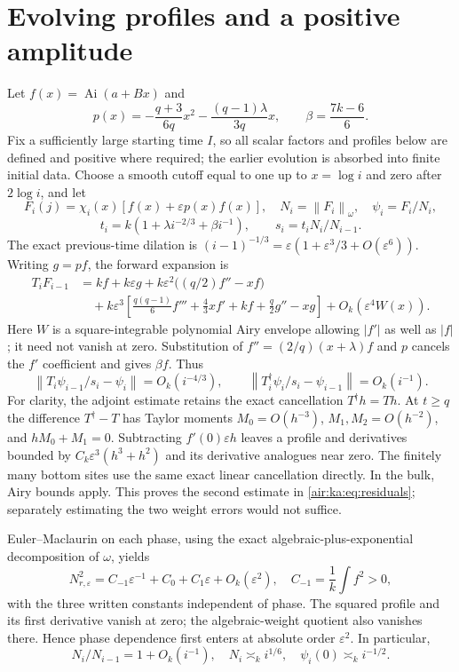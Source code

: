 \documentclass[11pt,letterpaper]{article}
\numberwithin{equation}{section}
\theoremstyle{remark}
\newcommand{\Ai}{\operatorname{Ai}}
\newcommand{\norm}[1]{\left\lVert#1\right\rVert}
\newcommand{\eps}{\varepsilon}
\begin{document}
\section{Evolving profiles and a positive amplitude}
Let $f(x)=\Ai(a+Bx)$ and
\[
 p(x)=-\frac{q+3}{6q}x^2-\frac{(q-1)\lambda}{3q}x,
 \qquad \beta=\frac{7k-6}{6}.
\]
Fix a sufficiently large starting time $I$, so all scalar factors and profiles below are defined and positive where required; the earlier evolution is absorbed into finite initial data. Choose a smooth cutoff equal to one up to $x=\log i$ and zero after $2\log i$, and let
\[
 F_i(j)=\chi_i(x)[f(x)+\eps p(x)f(x)],\quad
 N_i=\norm{F_i}_\omega,\quad \psi_i=F_i/N_i,
\]
\[
 t_i=k(1+\lambda i^{-2/3}+\beta i^{-1}),\qquad
 s_i=t_iN_i/N_{i-1}.
\]
The exact previous-time dilation is
$(i-1)^{-1/3}=\eps(1+\eps^3/3+O(\eps^6))$. Writing $g=pf$, the forward expansion is
\begin{align*}
 T_iF_{i-1}
 &=kf+k\eps g+k\eps^2\bigl((q/2)f''-xf\bigr)\\
 &\quad+k\eps^3\left[\frac{q(q-1)}6f'''
 +\frac43xf'+kf+\frac q2g''-xg\right]+O_k(\eps^4W(x)).
\end{align*}
Here $W$ is a square-integrable polynomial Airy envelope allowing $|f'|$ as well as $|f|$; it need not vanish at zero. Substitution of $f''=(2/q)(x+\lambda)f$ and $p$ cancels the $f'$ coefficient and gives $\beta f$. Thus
\begin{equation}\label{air:ka:eq:residuals}
 \norm{T_i\psi_{i-1}/s_i-\psi_i}=O_k(i^{-4/3}),\qquad
 \norm{T_i^\dagger\psi_i/s_i-\psi_{i-1}}=O_k(i^{-1}).
\end{equation}
For clarity, the adjoint estimate retains the exact cancellation $T^\dagger h=Th$. At $t\ge q$ the difference $T^\dagger-T$ has Taylor moments $M_0=O(h^{-3})$, $M_1,M_2=O(h^{-2})$, and $hM_0+M_1=0$. Subtracting $f'(0)\eps h$ leaves a profile and derivatives bounded by $C_k\eps^3(h^3+h^2)$ and its derivative analogues near zero. The finitely many bottom sites use the same exact linear cancellation directly. In the bulk, Airy bounds apply. This proves the second estimate in \eqref{air:ka:eq:residuals}; separately estimating the two weight errors would not suffice.

Euler--Maclaurin on each phase, using the exact algebraic-plus-exponential decomposition of $\omega$, yields
\[
 N_{r,\eps}^2=C_{-1}\eps^{-1}+C_0+C_1\eps+O_k(\eps^2),
 \quad C_{-1}=\frac1k\int f^2>0,
\]
with the three written constants independent of phase. The squared profile and its first derivative vanish at zero; the algebraic-weight quotient also vanishes there. Hence phase dependence first enters at absolute order $\eps^2$. In particular,
\[
 N_i/N_{i-1}=1+O_k(i^{-1}),\quad N_i\asymp_k i^{1/6},
 \quad\psi_i(0)\asymp_k i^{-1/2}.
\]
\end{document}
